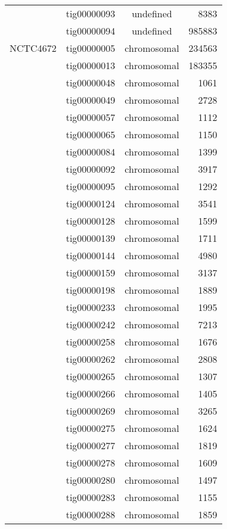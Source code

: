 {\begin{supertabular}{llcr}
          & tig00000093 & undefined & 8383 \\
          & tig00000094 & undefined & 985883 \\
\hline \hline
NCTC4672 & tig00000005 & chromosomal & 234563 \\
         & tig00000013 & chromosomal & 183355 \\
         & tig00000048 & chromosomal & 1061 \\
         & tig00000049 & chromosomal & 2728 \\
         & tig00000057 & chromosomal & 1112 \\
         & tig00000065 & chromosomal & 1150 \\
         & tig00000084 & chromosomal & 1399 \\
         & tig00000092 & chromosomal & 3917 \\
         & tig00000095 & chromosomal & 1292 \\
         & tig00000124 & chromosomal & 3541 \\
         & tig00000128 & chromosomal & 1599 \\
         & tig00000139 & chromosomal & 1711 \\
         & tig00000144 & chromosomal & 4980 \\
         & tig00000159 & chromosomal & 3137 \\
         & tig00000198 & chromosomal & 1889 \\
         & tig00000233 & chromosomal & 1995 \\
         & tig00000242 & chromosomal & 7213 \\
         & tig00000258 & chromosomal & 1676 \\
         & tig00000262 & chromosomal & 2808 \\
         & tig00000265 & chromosomal & 1307 \\
         & tig00000266 & chromosomal & 1405 \\
         & tig00000269 & chromosomal & 3265 \\
         & tig00000275 & chromosomal & 1624 \\
         & tig00000277 & chromosomal & 1819 \\
         & tig00000278 & chromosomal & 1609 \\
         & tig00000280 & chromosomal & 1497 \\
         & tig00000283 & chromosomal & 1155 \\
         & tig00000288 & chromosomal & 1859 \\

\end{supertabular}}
